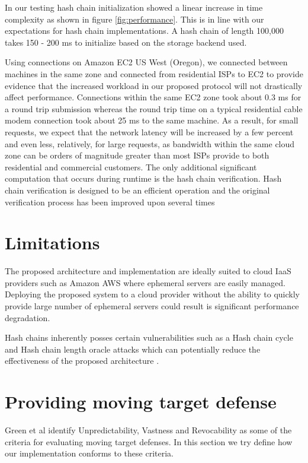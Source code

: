 \documentclass{sig-alternate-05-2015}
\begin{document}
In our testing hash chain initialization showed a linear increase in time complexity as shown in figure \ref{fig:performance}. This is in line with our expectations for hash chain implementations. A hash chain of length 100,000 takes 150 - 200 ms to initialize based on the storage backend used. 

Using connections on Amazon EC2 US West (Oregon), we connected between machines in the same zone and connected from residential ISPs to EC2 to provide evidence that the increased workload in our proposed protocol will not drastically affect performance.  Connections within the same EC2 zone took about 0.3 ms for a round trip submission whereas the round trip time on a typical residential cable modem connection took about 25 ms to the same machine.  As a result, for small requests, we expect that the network latency will be increased by a few percent and even less, relatively, for large requests, as bandwidth within the same cloud zone can be orders of magnitude greater than most ISPs provide to both residential and commercial customers.  The only additional significant computation that occurs during runtime is the hash chain verification.  Hash chain verification is designed to be an efficient operation and the original verification process has been improved upon several times \cite{fischlin_fast_2004, yum_fast_2010}

\section{Limitations}
The proposed architecture and implementation are ideally suited to cloud IaaS providers such as Amazon AWS where ephemeral servers are easily managed. Deploying the proposed system to a cloud provider without the ability to quickly provide large number of ephemeral servers  could result is significant performance degradation. 

Hash chains inherently posses certain vulnerabilities such as a Hash chain cycle and Hash chain length oracle attacks which can potentially reduce the effectiveness of the proposed architecture \cite{lee_hash_2007}.

\section{Providing moving target defense}

Green et al \cite{green_characterizing_2015} identify Unpredictability, Vastness and Revocability as some of the criteria for evaluating moving target defenses. In this section we try define how our implementation conforms to these criteria.
\end{document}
